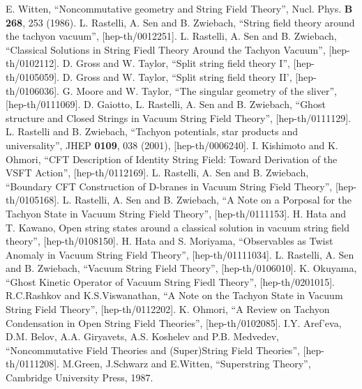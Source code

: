 \documentclass[a4paper,12pt]{article}
\begin{document}
\begin{thebibliography}{99}
 E. Witten, ``Noncommutative geometry and String Field Theory'',
Nucl. Phys. {\bf B 268}, 253 (1986).
 L. Rastelli, A. Sen and B. Zwiebach, ``String field theory
around the tachyon vacuum'', [hep-th/0012251].
 L. Rastelli, A. Sen and B. Zwiebach, ``Classical Solutions
in String Fiedl Theory Around the Tachyon Vacuum'', [hep-th/0102112].
 D. Gross and W. Taylor, ``Split string field theory I'',
[hep-th/0105059].
 D. Gross and W. Taylor, ``Split string field theory II',
[hep-th/0106036].
 G. Moore and W. Taylor, ``The singular geometry of the sliver'',
[hep-th/0111069].
 D. Gaiotto, L. Rastelli, A. Sen and B. Zwiebach, 
``Ghost structure and Closed Strings in Vacuum String Field Theory'',
[hep-th/0111129].
 L. Rastelli and B. Zwiebach, ``Tachyon potentials, star
products and universality'', JHEP {\bf 0109}, 038 (2001),
[hep-th/0006240].
 I. Kishimoto and K. Ohmori, ``CFT Description of Identity
String Field: Toward Derivation of the VSFT Action'', [hep-th/0112169].
 L. Rastelli, A. Sen and B. Zwiebach, ``Boundary CFT
Construction of D-branes in Vacuum String Field Theory'', [hep-th/0105168].
 L. Rastelli, A. Sen and B. Zwiebach, ``A Note on a Porposal
for the Tachyon State in Vacuum String Field Theory'', [hep-th/0111153].
 H. Hata and T. Kawano, Open string states around a classical
solution in vacuum string field theory'', [hep-th/0108150].
 H. Hata and S. Moriyama, ``Observables as Twist Anomaly
in Vacuum String Field Theory'', [hep-th/01111034].
 L. Rastelli, A. Sen and B. Zwiebach,
``Vacuum String Field Theory'', [hep-th/0106010].
 K. Okuyama, ``Ghost Kinetic Operator of Vacuum String Fiedl 
Theory'', [hep-th/0201015].
 R.C.Rashkov and K.S.Viswanathan, ``A Note on the Tachyon State
in Vacuum String Field Theory'', [hep-th/0112202].
 K. Ohmori, ``A Review on Tachyon Condensation in Open String
Field Theories'', [hep-th/0102085].
 I.Y. Aref'eva, D.M. Belov, A.A. Giryavets, A.S. Koshelev and
P.B. Medvedev, ``Noncommutative Field Theories and (Super)String Field
Theories'', [hep-th/0111208].
 M.Green, J.Schwarz and E.Witten, ``Superstring Theory'', 
Cambridge University Press, 1987.
\end{thebibliography}
\end{document}
